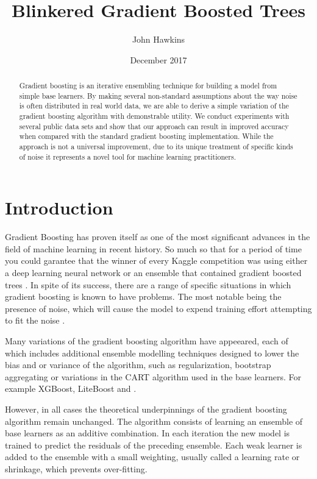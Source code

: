 \documentclass[11pt,twoside,a4paper]{article}
\begin{document}
\title{Blinkered Gradient Boosted Trees}
\author{John Hawkins}
\date{December 2017}
\maketitle

\begin{abstract}

Gradient boosting is an iterative ensembling technique for building a model from
simple base learners. By making several non-standard assumptions about the way noise is often
distributed in real world data, we are able to derive a simple variation of
the gradient boosting algorithm with demonstrable utility. 
We conduct experiments with several public data sets
and show that our approach can result in improved accuracy when compared with 
the standard gradient boosting implementation. While the approach is not a universal 
improvement, due to its unique treatment of specific kinds of noise it 
represents a novel tool for machine learning practitioners.

\end{abstract}

\section{Introduction}

Gradient Boosting has proven itself as one of the most significant advances in
the field of machine learning in recent history. So much so that for a period
of time you could garantee that the winner of every Kaggle competition was using
either a deep learning neural network or an ensemble that contained gradient
boosted trees \cite{}. In spite of its success, there are a range of specific situations 
in which gradient boosting is known to have problems. The most notable being the 
presence of noise, which will cause the model to expend training effort attempting
to fit the noise \cite{}.

Many variations of the gradient boosting algorithm have appeeared, each of which 
includes additional ensemble modelling techniques designed to lower the bias and
or variance of the algorithm, such as regularization, bootstrap aggregating or
variations in the CART algorithm used in the base learners.
For example XGBoost\cite{}, LiteBoost and .

However, in all cases the theoretical underpinnings of the gradient boosting algorithm
remain unchanged. The algorithm consists of learning an ensemble of base learners
as an additive combination. In each iteration the new model is trained to predict the
residuals of the preceding ensemble. Each weak learner is added to the ensemble with
a small weighting, usually called a learning rate or shrinkage, which prevents over-fitting. 
\end{document}
